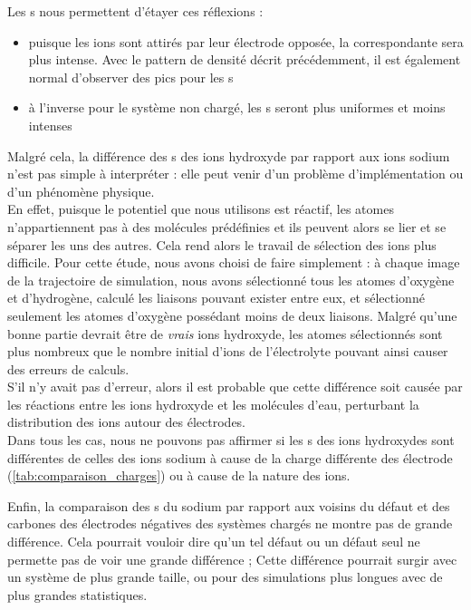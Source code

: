 Les \rdf{}s nous permettent d'étayer ces réflexions :
\begin{itemize}
    \item puisque les ions sont attirés par leur électrode opposée, la \rdf{} correspondante sera plus intense. Avec le pattern de densité décrit précédemment, il est également normal d'observer des pics pour les \rdf{}s
    \item à l'inverse pour le système non chargé, les \rdf{}s seront plus uniformes et moins intenses
\end{itemize}

Malgré cela, la différence des \rdf{}s des ions hydroxyde par rapport aux ions sodium n'est pas simple à interpréter : elle peut venir d'un problème d'implémentation ou d'un phénomène physique.\\
En effet, puisque le potentiel que nous utilisons est réactif, les atomes n'appartiennent pas à des molécules prédéfinies et ils peuvent alors se lier et se séparer les uns des autres. Cela rend alors le travail de sélection des ions plus difficile. Pour cette étude, nous avons choisi de faire simplement : à chaque image de la trajectoire de simulation, nous avons sélectionné tous les atomes d'oxygène et d'hydrogène, calculé les liaisons pouvant exister entre eux, et sélectionné seulement les atomes d'oxygène possédant moins de deux liaisons. Malgré qu'une bonne partie devrait être de \emph{vrais} ions hydroxyde, les atomes sélectionnés sont plus nombreux que le nombre initial d'ions de l'électrolyte pouvant ainsi causer des erreurs de calculs.\\
S'il n'y avait pas d'erreur, alors il est probable que cette différence soit causée par les réactions entre les ions hydroxyde et les molécules d'eau, perturbant la distribution des ions autour des électrodes.\\
Dans tous les cas, nous ne pouvons pas affirmer si les \rdf{}s des ions hydroxydes sont différentes de celles des ions sodium à cause de la charge différente des électrode (\autoref{tab:comparaison_charges}) ou à cause de la nature des ions.

Enfin, la comparaison des \rdf{}s du sodium par rapport aux voisins du défaut et des carbones des électrodes négatives des systèmes chargés ne montre pas de grande différence. Cela pourrait vouloir dire qu'un tel défaut ou un défaut seul ne permette pas de voir une grande différence ; Cette différence pourrait surgir avec un système de plus grande taille, ou pour des simulations plus longues avec de plus grandes statistiques.

